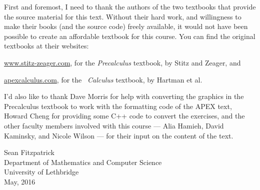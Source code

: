 First and foremost, I need to thank the authors of the two textbooks that provide the source material for this text. Without their hard work, and willingness to make their books (and the source code) freely available, it would not have been possible to create an affordable textbook for this course. You can find the original textbooks at their websites:

\bigskip


\href{http://www.stitz-zeager.com}{www.stitz-zeager.com}, for the \textit{Precalculus} textbook, by Stitz and Zeager, and

\bigskip


\href{http://www.apexcalculus.com}{apexcalculus.com}, for the \apex\ \textit{Calculus} textbook, by Hartman et al.

\bigskip

I'd also like to thank Dave Morris for help with converting the graphics in the Precalculus textbook to work with the formatting code of the APEX text, Howard Cheng for providing some C++ code to convert the exercises, and the other faculty members involved with this course --- Alia Hamieh, David Kaminsky, and Nicole Wilson --- for their input on the content of the text.

\vspace{1in}

\begin{raggedright}
Sean Fitzpatrick\\
Department of Mathematics and Computer Science\\
University of Lethbridge\\
May, 2016
\end{raggedright}




